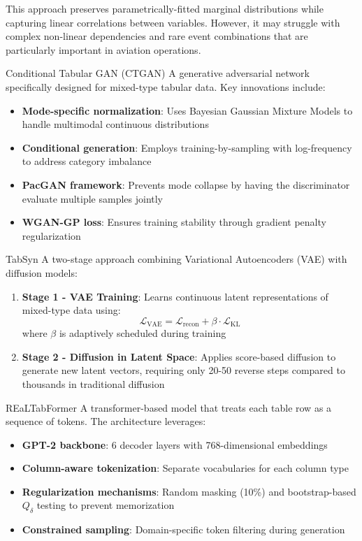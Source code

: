 \documentclass[conference]{IEEEtran}
\begin{document}
This approach preserves parametrically-fitted marginal distributions while capturing linear correlations between variables. However, it may struggle with complex non-linear dependencies and rare event combinations that are particularly important in aviation operations.


Conditional Tabular GAN (CTGAN) \cite{xu2019modeling}
A generative adversarial network specifically designed for mixed-type tabular data. Key innovations include:
\begin{itemize}
    \item \textbf{Mode-specific normalization}: Uses Bayesian Gaussian Mixture Models to handle multimodal continuous distributions
    \item \textbf{Conditional generation}: Employs training-by-sampling with log-frequency to address category imbalance
    \item \textbf{PacGAN framework}: Prevents mode collapse by having the discriminator evaluate multiple samples jointly
    \item \textbf{WGAN-GP loss}: Ensures training stability through gradient penalty regularization
\end{itemize}

TabSyn \cite{zhang2024mixed}
A two-stage approach combining Variational Autoencoders (VAE) with diffusion models:
\begin{enumerate}
    \item \textbf{Stage 1 - VAE Training}: Learns continuous latent representations of mixed-type data using:
    \begin{equation}
    \mathcal{L}_{\text{VAE}} = \mathcal{L}_{\text{recon}} + \beta \cdot \mathcal{L}_{\text{KL}}
    \end{equation}
    where $\beta$ is adaptively scheduled during training
    \item \textbf{Stage 2 - Diffusion in Latent Space}: Applies score-based diffusion to generate new latent vectors, requiring only 20-50 reverse steps compared to thousands in traditional diffusion
\end{enumerate}

REaLTabFormer \cite{solatorio2023realtabformer}
A transformer-based model that treats each table row as a sequence of tokens. The architecture leverages:
\begin{itemize}
    \item \textbf{GPT-2 backbone}: 6 decoder layers with 768-dimensional embeddings
    \item \textbf{Column-aware tokenization}: Separate vocabularies for each column type
    \item \textbf{Regularization mechanisms}: Random masking (10\%) and bootstrap-based $Q_\delta$ testing to prevent memorization
    \item \textbf{Constrained sampling}: Domain-specific token filtering during generation
\end{itemize}
\end{document}
